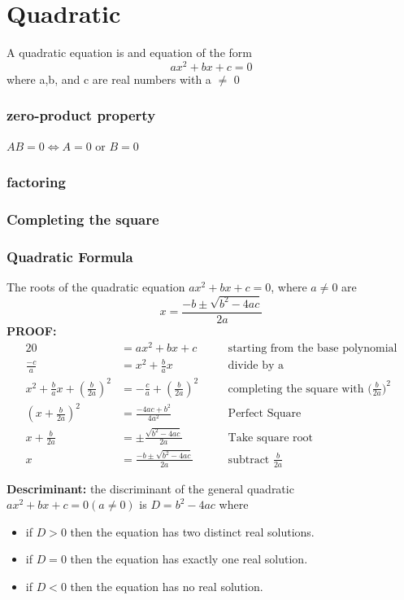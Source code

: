 \documentclass[a4paper,11pt]{book}
\newcommand{\justif}[2]{&{#1}&\text{#2}}
\begin{document}
\section{Quadratic}
A quadratic equation is and equation of the form $$ax^2+bx+c=0 $$ where a,b, and c are real numbers with a $\neq$ 0
\subsubsection{zero-product property}
$AB=0 \iff A=0$ or $B=0$
\subsubsection{factoring}
\subsubsection{Completing the square}
\subsubsection{Quadratic Formula}
The roots of the quadratic equation $ax^2+bx+c=0$, where $a\neq0$ are $$ x = \frac{-b\pm\sqrt{b^2-4ac}}{2a}$$
\textbf{PROOF:}
\begin{alignat*}{2}
					0 &= ax^2+bx+c                                             \justif{\quad}{starting from the base polynomial}\\
	   \frac{-c}{a} &= x^2+\frac{b}{a}x                                        \justif{\quad}{divide by a}\\
    x^2+\frac{b}{a}x+(\frac{b}{2a})^2&= -\frac{c}{a}+ (\frac{b}{2a})^2         \justif{\quad}{completing the square with $(\frac{b}{2a}$})^2 \\
    (x+\frac{b}{2a})^2&=\frac{-4ac+b^2}{4a^2}                                                  \justif{\quad}{Perfect Square}\\
	 x+\frac{b}{2a}  &= \pm\frac{\sqrt{b^2-4ac}}{2a}                          \justif{\quad}{Take square root}\\
    x &= \frac{-b\pm\sqrt{b^2-4ac}}{2a}   \justif{\quad}{subtract $\frac{b}{2a}$}  
\end{alignat*}

\textbf{Descriminant:} the discriminant of the general quadratic $ax^2+bx+c=0 (a\neq0) $ is $D=b^2-4ac$ where
\begin{itemize}
\item if $D > 0$ then the equation has two distinct real solutions.
\item if $D = 0 $ then the equation has exactly one real solution.
\item if $D < 0$ then the equation has no real solution.
\end{itemize}
\end{document}
